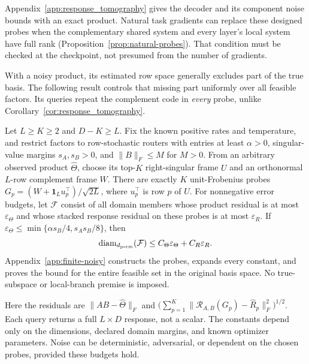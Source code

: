 Appendix~\ref{app:response_tomography} gives the decoder and its component
noise bounds with an exact product. Natural task gradients can replace
these designed probes when the complementary shared system and every
layer's local system have full rank
(Proposition~\ref{prop:natural-probes}). That condition must be checked
at the checkpoint, not presumed from the number of gradients.

With a noisy product, its estimated row space generally excludes part of
the true basis. The following result controls that missing part uniformly
over all feasible factors. Its queries repeat the complement code in
\emph{every} probe, unlike Corollary~\ref{cor:response_tomography}.

\begin{corollary}
\label{cor:finite-noisy-main}
Let $L\ge K\ge2$ and $D-K\ge L$. Fix the known positive rates and
temperature, and restrict factors to row-stochastic routers with entries
at least $\alpha>0$, singular-value margins $s_A,s_B>0$, and $\|B\|_F\le M$
for $M>0$.
From an arbitrary observed product $\widehat\Theta$, choose its top-$K$
right-singular frame $U$ and an orthonormal $L$-row complement frame $W$.
There are exactly $K$ unit-Frobenius probes
$G_p=(W+\mathbf1_Lu_p^\top)/\sqrt{2L}$, where $u_p^\top$ is row $p$ of $U$.
For nonnegative error budgets, let $\mathcal F$ consist of all domain members
whose product residual is at
most $\varepsilon_\Theta$ and whose stacked response residual on these
probes is at most $\varepsilon_R$. If
$\varepsilon_\Theta\le\min\{\alpha s_B/4,s_As_B/8\}$, then
\[
 \operatorname{diam}_{d_{\rm perm}}(\mathcal F)
 \le C_\Theta\varepsilon_\Theta+C_R\varepsilon_R.
\]
Appendix~\ref{app:finite-noisy} constructs the probes, expands every
constant, and proves the bound for the entire feasible set in the original
basis space. No true-subspace or local-branch premise is imposed.
\end{corollary}


Here the residuals are $\|AB-\widehat\Theta\|_F$ and
$\bigl(\sum_{p=1}^K\|\mathcal R_{A,B}(G_p)-\widehat R_p\|_F^2\bigr)^{1/2}$.
Each query returns a full $L\times D$ response, not a scalar. The constants
depend only on the dimensions, declared domain margins, and known optimizer
parameters. Noise can be deterministic, adversarial, or dependent on the
chosen probes, provided these budgets hold.

